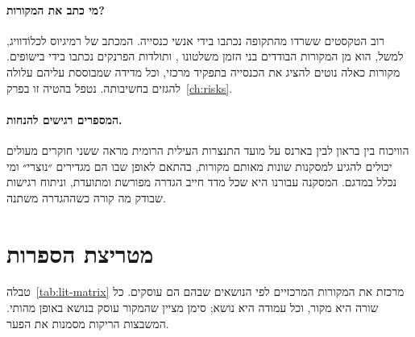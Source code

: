 \paragraph{מי כתב את המקורות?} רוב הטקסטים ששרדו מהתקופה נכתבו בידי אנשי כנסייה. המכתב של רמיגיוס לכלוֹדוויג, למשל, הוא מן המקורות הבודדים בני הזמן משלטונו \cite{barrett2016remigius}, ותולדות הפרנקים נכתבו בידי בישופים. מקורות כאלה נוטים להציג את הכנסייה בתפקיד מרכזי, וכל מדידה שמבוססת עליהם עלולה להגזים בחשיבותה. נטפל בהטיה זו בפרק~\ref{ch:risks}.

\paragraph{המספרים רגישים להנחות.} הוויכוח בין בראון לבין בארנס על מועד התנצרות העילית הרומית \cite{brown1961aspects,barnes1995statistics} מראה ששני חוקרים מעולים יכולים להגיע למסקנות שונות מאותם מקורות, בהתאם לאופן שבו הם מגדירים ״נוצרי״ ומי נכלל במדגם. המסקנה עבורנו היא שכל מדד חייב הגדרה מפורשת ומתועדת, וניתוח רגישות שבודק מה קורה כשההגדרה משתנה.

\section{מטריצת הספרות}
\label{sec:lit-matrix}

טבלה~\ref{tab:lit-matrix} מרכזת את המקורות המרכזיים לפי הנושאים שבהם הם עוסקים. כל שורה היא מקור, וכל עמודה היא נושא; סימן \checkmark{} מציין שהמקור עוסק בנושא באופן מהותי. המשבצות הריקות מסמנות את הפער.

